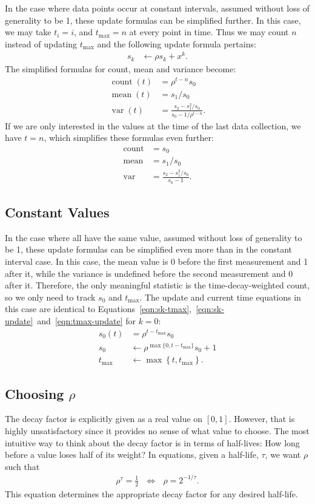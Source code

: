\documentclass{article}
\DeclareMathOperator{\cnt}{count}
\DeclareMathOperator{\mean}{mean}
\DeclareMathOperator{\var}{var}
\newcommand{\tmax}{{t_\text{max}}}
\begin{document}
In the case where data points occur at constant intervals, assumed without loss of generality to be 1, these update formulas can be simplified further.
In this case, we may take $t_i = i$, and $\tmax = n$ at every point in time.
Thus we may count $n$ instead of updating $\tmax$ and the following update formula pertains:
\begin{align}
s_k &\leftarrow \rho s_k + x^k.
\end{align}
The simplified formulas for count, mean and variance become:
\begin{align}
\cnt(t) &= \rho^{t-n} s_0 \\
\mean(t) &= s_1/s_0 \\
\var(t) &= \frac{s_2 - s_1^2/s_0}{s_0-1/\rho^{t-n}}.
\end{align}
If we are only interested in the values at the time of the last data collection, we have $t = n$, which simplifies these formulas even further:
\begin{align}
\cnt &= s_0 \\
\mean &= s_1/s_0 \\
\var &= \frac{s_2 - s_1^2/s_0}{s_0-1}.
\end{align}

\subsection{Constant Values}

In the case where all have the same value, assumed without loss of generality to be 1, these update formulas can be simplified even more than in the constant interval case.
In this case, the mean value is 0 before the first measurement and 1 after it, while the variance is undefined before the second measurement and 0 after it.
Therefore, the only meaningful statistic is the time-decay-weighted count, so we only need to track $s_0$ and $\tmax$.
The update and current time equations in this case are identical to Equations~\ref{eqn:sk-tmax},~\ref{eqn:sk-update}~and~\ref{eqn:tmax-update} for $k=0$:
\begin{align}
\label{eqn:sk-tmax}
s_0(t) &= \rho^{t-\tmax} s_0 \\
s_0 &\leftarrow \rho^{\max\{0,t-\tmax\}} s_0 + 1 \\
\tmax &\leftarrow \max\left\{t,\tmax\right\}.
\end{align}

\subsection{Choosing $\rho$}

The decay factor is explicitly given as a real value on $[0,1]$.
However, that is highly unsatisfactory since it provides no sense of what value to choose.
The most intuitive way to think about the decay factor is in terms of half-lives:
How long before a value loses half of its weight?
In equations, given a half-life, $\tau$, we want $\rho$ such that
\begin{align}
\rho^\tau = \frac{1}{2} ~~~ \iff ~~~ \rho = 2^{-1/\tau}.
\end{align}
This equation determines the appropriate decay factor for any desired half-life.
\end{document}
